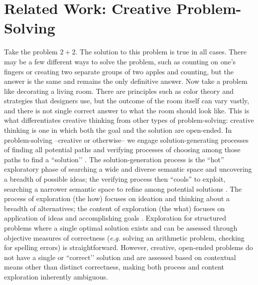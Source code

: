 \chapter{Related Work: Creative Problem-Solving}

Take the problem $2 + 2$. The solution to this problem is true in all cases. There may be a few different ways to solve the problem, such as counting on one’s fingers or creating two separate groups of two apples and counting, but the answer is the same and remains the only definitive answer. Now take a problem like decorating a living room. There are principles such as color theory and strategies that designers use, but the outcome of the room itself can vary vastly, and there is not single correct answer to what the room should look like. This is what differentiates creative thinking from other types of problem-solving: creative thinking is one in which both the goal and the solution are open-ended. In problem-solving --creative or otherwise-- we engage solution-generating processes of finding all potential paths and verifying processes of choosing among those paths to find a ``solution’’ \cite{Newell1962processes}. The solution-generation process is the ``hot'' exploratory phase of searching a wide and diverse semantic space and uncovering a breadth of possible ideas; the verifying process then ``cools'' to exploit, searching a narrower semantic space to refine among potential solutions \cite{kirkpatrick1983optimization, lucas2014children}. The process of exploration (the how) focuses on ideation and thinking about a breadth of alternatives; the content of exploration (the what) focuses on application of ideas and accomplishing goals \cite{Kelley2013, kemp2007learning, Newell1962processes, osborn1953applied}. Exploration for structured problems where a single optimal solution exists and can be assessed through objective measures of correctness (\textit{e.g.} solving an arithmetic problem, checking for spelling errors) is straightforward. However, creative, open-ended problems do not have a single or ``correct’’ solution and are assessed based on contextual means other than distinct correctness, making both process and content exploration inherently ambiguous. 


